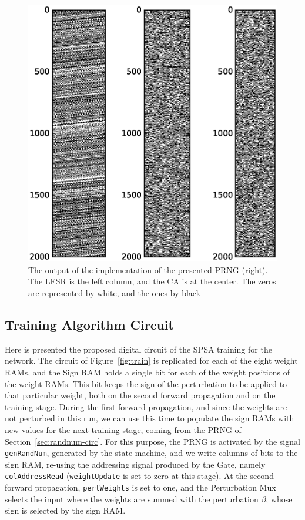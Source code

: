 \begin{figure}
    \centering
    \includegraphics[width=\linewidth]{figures/prng_out.eps}
    \caption[The output of the implementation of the presented PRNG (right). The LFSR is the left column, and the CA is at the center]{The output of the implementation of the presented PRNG (right). The LFSR is the left column, and the CA is at the center. The zeros are represented by white, and the ones by black}
    \label{fig:prng_out}
\end{figure}



\subsection{Training Algorithm Circuit}\label{sec:train-circ}
Here is presented the proposed digital circuit of the SPSA training for the network. The circuit of Figure~\ref{fig:train} is replicated for each of the
eight weight RAMs, and the Sign RAM holds a single bit for each of the weight positions of the weight RAMs. This bit keeps the sign of the perturbation
to be applied to that particular weight, both on the second forward propagation and on the training stage. During the first forward propagation, and since
the weights are not perturbed in this run, we can use this time to populate the sign RAMs with new values for the next training stage, coming from the
PRNG of Section~\ref{sec:randnum-circ}. For this purpose, the PRNG is activated by the signal \verb+genRandNum+, generated by the state machine, and we
write columns of bits to the sign RAM, re-using the addressing signal produced by the Gate, namely \verb+colAddressRead+ (\verb+weightUpdate+ is set to
zero at this stage). At the second forward propagation, \verb+pertWeights+ is set to one, and the Perturbation Mux selects the input where the weights
are summed with the perturbation $\beta$, whose sign is selected by the sign RAM.

